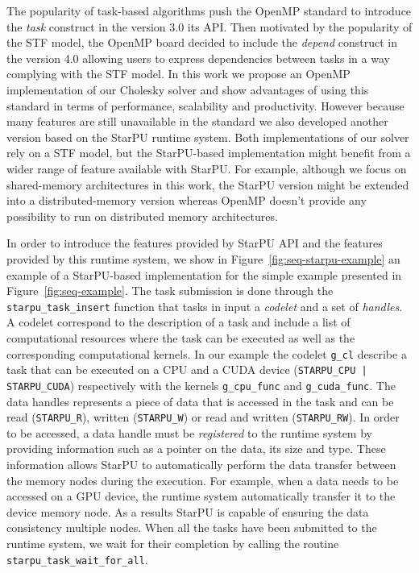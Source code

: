 \documentclass{article}
\begin{document}
The popularity of task-based algorithms push the OpenMP standard to
introduce the \textit{task} construct in the version 3.0 its API. Then
motivated by the popularity of the STF model, the OpenMP board decided
to include the \textit{depend} construct in the version 4.0 allowing
users to express dependencies between tasks in a way complying with
the STF model. In this work we propose an OpenMP implementation of our
Cholesky solver and show advantages of using this standard in terms of
performance, scalability and productivity. However because many
features are still unavailable in the standard we also developed
another version based on the StarPU runtime system. Both
implementations of our solver rely on a STF model, but the
StarPU-based implementation might benefit from a wider range of
feature available with StarPU. For example, although we focus on
shared-memory architectures in this work, the StarPU version might be
extended into a distributed-memory version whereas OpenMP doesn't
provide any possibility to run on distributed memory architectures.

In order to introduce the features provided by StarPU API and the
features provided by this runtime system, we show in Figure~\ref{fig:seq-starpu-example} an example of a
StarPU-based implementation for the simple example presented in
Figure~\ref{fig:seq-example}. The task submission is done through the
\texttt{starpu\_task\_insert} function that tasks in input a
\textit{codelet} and a set of \textit{handles}. A codelet correspond
to the description of a task and include a list of computational
resources where the task can be executed as well as the corresponding
computational kernels. In our example the codelet \texttt{g\_cl}
describe a task that can be executed on a CPU and a CUDA device
(\texttt{STARPU\_CPU | STARPU\_CUDA}) respectively with the kernels
\texttt{g\_cpu\_func} and \texttt{g\_cuda\_func}. The data handles
represents a piece of data that is accessed in the task and can be
read (\texttt{STARPU\_R}), written (\texttt{STARPU\_W}) or read and
written (\texttt{STARPU\_RW}). In order to be accessed, a data handle
must be \textit{registered} to the runtime system by providing
information such as a pointer on the data, its size and type. These
information allows StarPU to automatically perform the data transfer
between the memory nodes during the execution. For example, when a
data needs to be accessed on a GPU device, the runtime system
automatically transfer it to the device memory node. As a results
StarPU is capable of ensuring the data consistency multiple
nodes. When all the tasks have been submitted to the runtime system,
we wait for their completion by calling the routine
\texttt{starpu\_task\_wait\_for\_all}.
\end{document}
